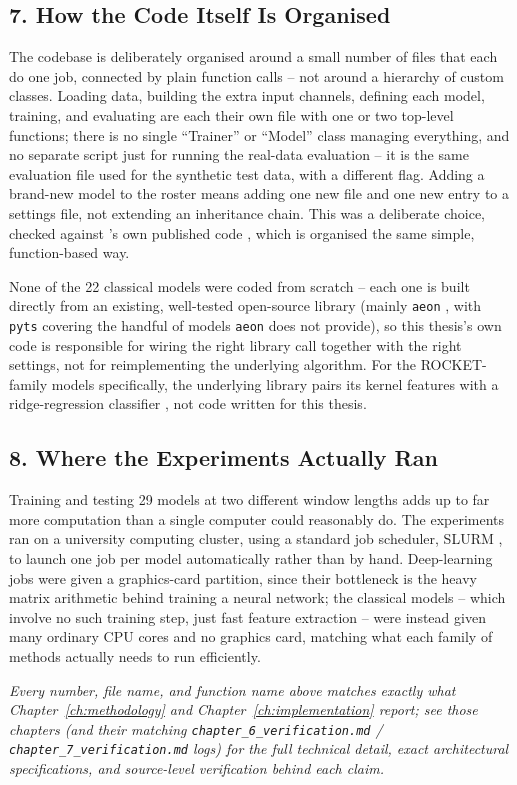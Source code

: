 \subsection*{7. How the Code Itself Is Organised}

The codebase is deliberately organised around a small number of files
that each do one job, connected by plain function calls -- not around a
hierarchy of custom classes. Loading data, building the extra input
channels, defining each model, training, and evaluating are each their
own file with one or two top-level functions; there is no single
``Trainer'' or ``Model'' class managing everything, and no separate
script just for running the real-data evaluation -- it is the same
evaluation file used for the synthetic test data, with a different flag.
Adding a brand-new model to the roster means adding one new file and one
new entry to a settings file, not extending an inheritance chain. This
was a deliberate choice, checked against \citet{bury2021}'s own published
code \citep{burygithub}, which is organised the same simple,
function-based way.

None of the 22 classical models were coded from scratch -- each one is
built directly from an existing, well-tested open-source library (mainly
\texttt{aeon} \citep{aeon2024}, with \texttt{pyts} \citep{pyts2020}
covering the handful of models \texttt{aeon} does not provide), so this
thesis's own code is responsible for wiring the right library call
together with the right settings, not for reimplementing the underlying
algorithm. For the ROCKET-family models specifically, the underlying
library pairs its kernel features with a ridge-regression classifier
\citep{pedregosa2011sklearn}, not code written for this thesis.

\subsection*{8. Where the Experiments Actually Ran}

Training and testing 29 models at two different window lengths adds up
to far more computation than a single computer could reasonably do. The
experiments ran on a university computing cluster, using a standard job
scheduler, SLURM \citep{yoo2003slurm}, to launch one job per model
automatically rather than by hand. Deep-learning jobs were given a
graphics-card partition, since their bottleneck is the heavy matrix
arithmetic behind training a neural network; the classical models --
which involve no such training step, just fast feature extraction --
were instead given many ordinary CPU cores and no graphics card, matching
what each family of methods actually needs to run efficiently.

\bigskip
\noindent\emph{Every number, file name, and function name above matches
exactly what Chapter~\ref{ch:methodology} and Chapter~\ref{ch:implementation}
report; see those chapters (and their matching
\texttt{chapter\_6\_verification.md} / \texttt{chapter\_7\_verification.md}
logs) for the full technical detail, exact architectural specifications,
and source-level verification behind each claim.}
